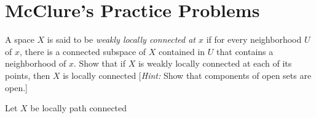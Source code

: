 \section{McClure's Practice Problems}
\begin{problem}[Munkres \S25, p.\,162, \#6]
A space $X$ is said to be \emph{weakly locally connected at $x$}
if for every neighborhood $U$ of $x$, there is a connected
subspace of $X$ contained in $U$ that contains a neighborhood of
$x$. Show that if $X$ is weakly locally connected at each of its
points, then $X$ is locally connected [\emph{Hint:} Show that
components of open sets are open.]
\end{problem}
\begin{problem}
Let $X$ be locally path connected
\end{problem}

